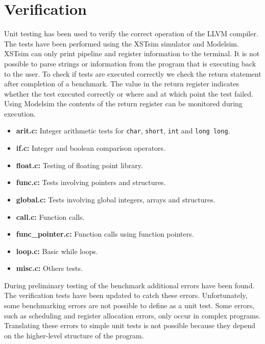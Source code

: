 
\section{Verification}
Unit testing has been used to verify the correct operation of the LLVM compiler. The tests have been performed using the XSTsim simulator and Modelsim. XSTsim can only print pipeline and register information to the terminal. It is not possible to parse strings or information from the program that is executing back to the user. To check if tests are executed correctly we check the return statement after completion of a benchmark. The value in the return register indicates whether the test executed correctly or where and at which point the test failed. Using Modelsim the contents of the return register can be monitored during execution.

\begin{itemize}
	\item \textbf{arit.c:} Integer arithmetic tests for \texttt{char}, \texttt{short}, \texttt{int} and \texttt{long long}.
	\item \textbf{if.c:} Integer and boolean comparison operators.
	\item \textbf{float.c:} Testing of floating point library.
	\item \textbf{func.c:} Tests involving pointers and structures.
	\item \textbf{global.c:}  Tests involving global integers, arrays and structures.
	\item \textbf{call.c:} Function calls.
	\item \textbf{func\_pointer.c:} Function calls using function pointers.
	\item \textbf{loop.c:} Basic while loops.
	\item \textbf{misc.c:} Others tests.
\end{itemize}

During preliminary testing of the benchmark additional errors have been found. The verification tests have been updated to catch these errors. Unfortunately, some benchmarking errors are not possible to define as a unit test. Some errors, such as scheduling and register allocation errors, only occur in complex programs. Translating these errors to simple unit tests is not possible because they depend on the higher-level structure of the program.


